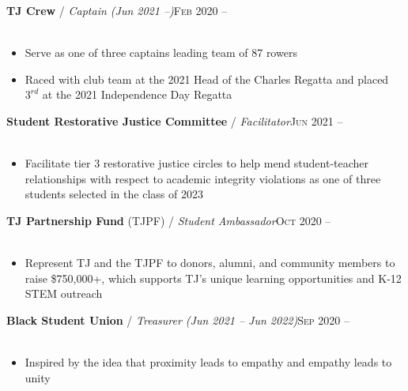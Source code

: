 \documentclass[12pt, a4paper]{article}
\begin{document}
\textbf{TJ Crew} / \textit{Captain (Jun 2021 --)}\hfill\textsc{Feb 2020 --}\\\
\begin{itemize}
    \vspace{-8mm}
    \item Serve as one of three captains leading team of 87 rowers
    \item Raced with club team at the 2021 Head of the Charles Regatta and placed $3^{rd}$ at the 2021 Independence Day Regatta
\end{itemize}

\textbf{Student Restorative Justice Committee} / \textit{Facilitator}\hfill\textsc{Jun 2021 --}\\\
\begin{itemize}
    \vspace{-8mm}
    \item Facilitate tier 3 restorative justice circles to help mend student-teacher relationships with respect to academic integrity violations as one of three students selected in the class of 2023
\end{itemize}

\textbf{TJ Partnership Fund} (TJPF) / \textit{Student Ambassador}\hfill\textsc{Oct 2020 --}\\\
\begin{itemize}
    \vspace{-8mm}
    \item Represent TJ and the TJPF to donors, alumni, and community members to raise \$750,000+, which supports TJ's unique learning opportunities and K-12 STEM outreach
\end{itemize}

\textbf{Black Student Union} / \textit{Treasurer (Jun 2021 -- Jun 2022)}\hfill\textsc{Sep 2020 --}\\\
\begin{itemize}
    \vspace{-8mm}
    \item Inspired by the idea that proximity leads to empathy and empathy leads to unity
\end{itemize}

\end{document}
